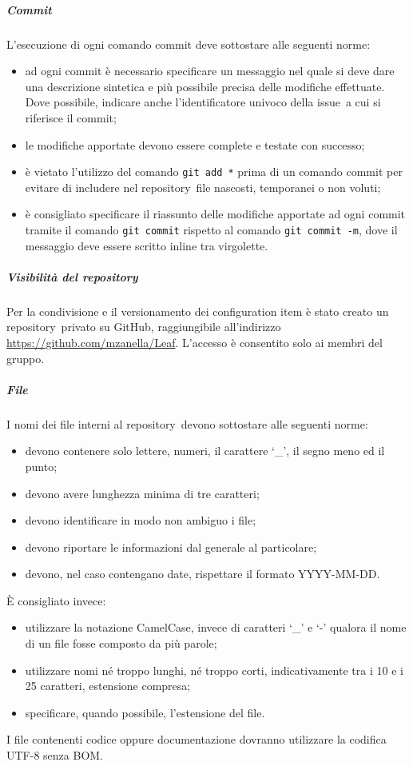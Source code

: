 \documentclass[../NormeProgetto.text]{subfiles}
\begin{document}
			\subparagraph{Commit}
				L'esecuzione di ogni comando commit deve sottostare alle seguenti norme:
				\begin{itemize}
					\item ad ogni commit è necessario specificare un messaggio nel quale si deve dare una descrizione sintetica e più possibile precisa delle modifiche effettuate. Dove possibile, indicare anche l'identificatore univoco della issue\g\ a cui si riferisce il commit;
					\item le modifiche apportate devono essere complete e testate con successo;
					\item è vietato l'utilizzo del comando \texttt{git add *} prima di un comando commit per evitare di includere nel repository\g\ file nascosti, temporanei o non voluti;
					\item è consigliato specificare il riassunto delle modifiche apportate ad ogni commit tramite il comando \texttt{git commit} rispetto al comando \texttt{git commit -m}, dove il messaggio deve essere scritto inline tra virgolette.
				\end{itemize}
			\subparagraph{Visibilità del repository}
				Per la condivisione e il versionamento dei configuration item è stato creato un repository\g\ privato su GitHub\g, raggiungibile all'indirizzo \url{https://github.com/mzanella/Leaf}. L'accesso è consentito solo ai membri del gruppo.	
			\subparagraph{File}	
					I nomi dei file interni al repository\g\ devono sottostare alle seguenti norme:
					\begin{itemize}
						\item devono contenere solo lettere, numeri, il carattere `\_', il segno meno ed il punto;
						\item devono avere lunghezza minima di tre caratteri;
						\item devono identificare in modo non ambiguo i file;
						\item devono riportare le informazioni dal generale al particolare;
						\item devono, nel caso contengano date, rispettare il formato YYYY-MM-DD.
					\end{itemize}
					È consigliato invece:
					\begin{itemize}
						\item utilizzare la notazione CamelCase\g, invece di caratteri `\_' e `-' qualora il nome di un file fosse composto da più parole;
						\item utilizzare nomi né troppo lunghi, né troppo corti, indicativamente tra i 10 e i 25 caratteri, estensione compresa;
						\item specificare, quando possibile, l'estensione del file.
					\end{itemize}
					I file contenenti codice oppure documentazione dovranno utilizzare la codifica UTF-8 senza BOM\g.
\newpage
\end{document}
